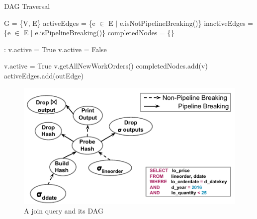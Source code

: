 \begin{algorithm}
	\caption{DAG Traversal}
	\begin{algorithmic}[1]
		\State G = \{V, E\}
		\State activeEdges = \{e $\in$ E $|$ e.isNotPipelineBreaking()\}
		\label{alg:pipelining}
		\State inactiveEdges = \{e $\in$ E $|$ e.isPipelineBreaking()\}
		\State completedNodes = \{\}
		
		:
				\State v.active = True
			\Else
				\State v.active = False
			\EndIf
		\EndFor
		
			\State v.active = True \label{alg:depMet}
		\EndIf
		\State v.getAllNewWorkOrders() \label{alg:getWork}
		 \label{alg:finishGenWork}
		\State completedNodes.add(v) \label{alg:nodeComplete}
		\State activeEdges.add(outEdge)\label{alg:outEdgesActive}
		\EndFor
		\EndIf
		\EndIf
		\EndFor	
		\EndWhile
	\end{algorithmic}
	\label{alg:dag-traversal}
\end{algorithm}

\begin{figure}[]
	\centering
	\includegraphics[width=\columnwidth]{figures/QueryPlan.pdf}
	\vspace*{-2em}
	\caption{A join query and its DAG}
	\label{fig:dag}
\end{figure}

